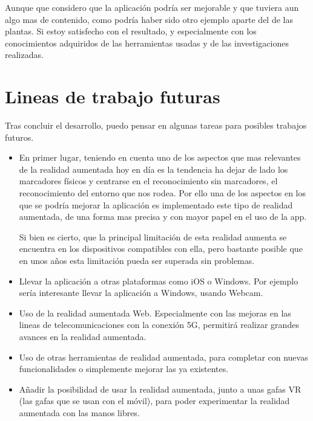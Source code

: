 Aunque que considero que la aplicación podría ser mejorable y que tuviera aun algo mas de contenido, como podría haber sido otro ejemplo aparte del de las plantas. Si estoy satisfecho con el resultado, y especialmente con los conocimientos adquiridos de las herramientas usadas y de las investigaciones realizadas.

\section{Lineas de trabajo futuras}
Tras concluir el desarrollo, puedo pensar en algunas tareas para posibles trabajos futuros.
\begin{itemize}
	\item En primer lugar, teniendo en cuenta uno de los aspectos que mas relevantes de la realidad aumentada hoy en día es la tendencia ha dejar de lado los marcadores físicos y centrarse en el reconocimiento sin marcadores, el reconocimiento del entorno que nos rodea.
	Por ello una de los aspectos en los que se podría mejorar la aplicación es implementado este tipo de realidad aumentada, de una forma mas precisa y con mayor papel en el uso de la app.
	
	Si bien es cierto, que la principal limitación de esta realidad aumenta se encuentra en los dispositivos compatibles con ella, pero bastante posible que en unos años esta limitación pueda ser superada sin problemas.
	\item Llevar la aplicación a otras plataformas como iOS o Windows. Por ejemplo sería interesante llevar la aplicación a Windows, usando Webcam.
	\item Uso de la realidad aumentada Web. Especialmente con las mejoras en las lineas de telecomunicaciones con la conexión 5G, permitirá realizar grandes avances en la realidad aumentada.
	\item Uso de otras herramientas de realidad aumentada, para completar con nuevas funcionalidades o simplemente mejorar las ya existentes.
	\item Añadir la posibilidad de usar la realidad aumentada, junto a unas gafas VR (las gafas que se usan con el móvil), para poder experimentar la realidad aumentada con las manos libres. 
	
\end{itemize}


